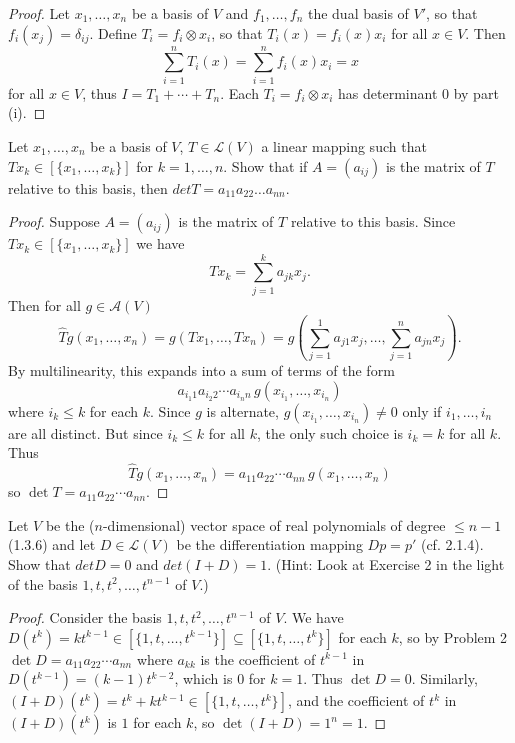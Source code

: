 \begin{proof}
    Let $x_1, \ldots, x_n$ be a basis of $V$ and $f_1, \ldots, f_n$ the dual basis of $V'$,
    so that $f_i(x_j) = \delta_{ij}$.
    Define $T_i = f_i \otimes x_i$, so that $T_i(x) = f_i(x)x_i$ for all $x \in V$.
    Then
    \[\sum_{i=1}^n T_i(x) = \sum_{i=1}^n f_i(x) x_i = x\]
    for all $x \in V$, thus $I = T_1 + \cdots + T_n$.
    Each $T_i = f_i \otimes x_i$ has determinant $0$ by part (i).
\end{proof}

\begin{tcolorbox}[title=Problem 2, breakable]
    Let $x_1, \ldots, x_n$ be a basis of $V$, $T \in \mathcal{L}(V)$
    a linear mapping such that $T x_k \in [\{x_1, \ldots, x_k\}]$
    for $k = 1, \ldots, n$. Show that if $A = (a_{ij})$ is the matrix of 
    $T$ relative to this basis, then $det T = a_{11} a_{22} \ldots a_{nn}$.
\end{tcolorbox}

\begin{proof}
    Suppose $A = (a_{ij})$ is the matrix of $T$ relative to this basis.
    Since $Tx_k \in [\{x_1, \ldots, x_k\}]$ we have
    \[Tx_k = \sum_{j=1}^k a_{jk} x_j.\]
    Then for all $g \in \mathcal{A}(V)$
    \[\hat{T}g(x_1, \ldots, x_n) = g(Tx_1, \ldots, Tx_n) = g\!\left(\sum_{j=1}^1 a_{j1}x_j, \ldots, \sum_{j=1}^n a_{jn}x_j\right).\]
    By multilinearity, this expands into a sum of terms of the form
    \[a_{i_1 1} a_{i_2 2} \cdots a_{i_n n}\, g(x_{i_1}, \ldots, x_{i_n})\]
    where $i_k \le k$ for each $k$. Since $g$ is alternate, $g(x_{i_1}, \ldots, x_{i_n}) \ne 0$
    only if $i_1, \ldots, i_n$ are all distinct. But since $i_k \le k$ for all $k$,
    the only such choice is $i_k = k$ for all $k$. Thus
    \[\hat{T}g(x_1, \ldots, x_n) = a_{11} a_{22} \cdots a_{nn}\, g(x_1, \ldots, x_n)\]
    so $\det T = a_{11} a_{22} \cdots a_{nn}$.
\end{proof}

\begin{tcolorbox}[title=Problem 3, breakable]
    Let $V$ be the ($n$-dimensional) vector space of real polynomials of degree 
    $\le n - 1$ (1.3.6) and let $D \in \mathcal{L}(V)$ be the differentiation mapping 
    $Dp = p'$ (cf. 2.1.4). Show that $det D = 0$ and $det (I + D) = 1$.
    (Hint: Look at Exercise 2 in the light of the basis $1, t, t^2, \ldots, t^{n - 1}$ of $V$.)
\end{tcolorbox}

\begin{proof}
    Consider the basis $1, t, t^2, \ldots, t^{n-1}$ of $V$.
    We have $D(t^k) = kt^{k-1} \in [\{1, t, \ldots, t^{k-1}\}] \subseteq [\{1, t, \ldots, t^k\}]$
    for each $k$, so by Problem 2 $\det D = a_{11} a_{22} \cdots a_{nn}$
    where $a_{kk}$ is the coefficient of $t^{k-1}$ in $D(t^{k-1}) = (k-1)t^{k-2}$,
    which is $0$ for $k = 1$. Thus $\det D = 0$.
    Similarly, $(I + D)(t^k) = t^k + kt^{k-1} \in [\{1, t, \ldots, t^k\}]$,
    and the coefficient of $t^k$ in $(I+D)(t^k)$ is $1$ for each $k$,
    so $\det(I + D) = 1^n = 1$.
\end{proof}

